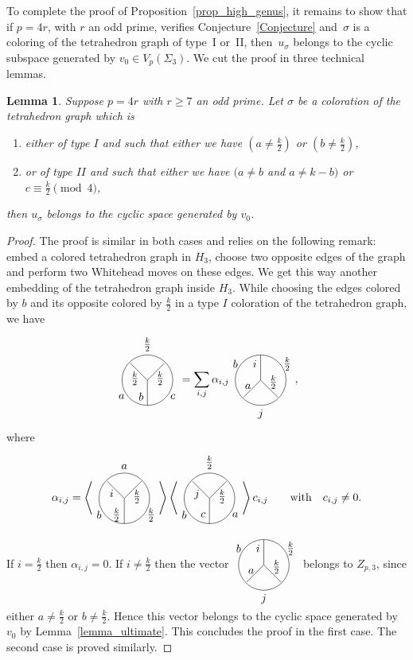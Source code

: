 \documentclass[pdftex]{sigma}
\numberwithin{equation}{section}
\newtheorem{Lemma}[Theorem]{Lemma}
\begin{document}
To complete the proof of Proposition~\ref{prop_high_genus}, it remains to show that if $p=4r$, with $r$ an odd prime, verifies Conjecture~\ref{Conjecture} and~$\sigma$ is a coloring of the tetrahedron graph of type~I or~II, then~$u_{\sigma}$ belongs to the cyclic subspace generated by $v_0\in V_p(\Sigma_3)$. We cut the proof in three technical lemmas.

\begin{Lemma}\label{lemma_mama} Suppose $p=4r$ with $r\geq 7$ an odd prime. Let $\sigma$ be a coloration of the tetrahedron graph which is
\begin{enumerate}\itemsep=0pt
\item[$1)$] either of type $I$ and such that either we have $(a\neq \frac{k}{2})$ or $(b\neq \frac{k}{2})$,
\item[$2)$] or of type $II$ and such that either we have $(a\neq b$ and $a\neq k-b)$ or $c\equiv \frac{k}{2} \pmod{4}$,
\end{enumerate}
 then $u_{\sigma}$ belongs to the cyclic space generated by $v_0$.
\end{Lemma}

\begin{proof}The proof is similar in both cases and relies on the following remark: embed a colored tetrahedron graph in $H_3$, choose two opposite edges of the graph and perform two Whitehead moves on these edges. We get this way another embedding of the tetrahedron graph inside $H_3$. While choosing the edges colored by $b$ and its opposite colored by $\frac{k}{2}$ in a type $I$ coloration of the tetrahedron graph, we have
\begin{gather*}
 \Tetahedrongraph{$\frac{k}{2}$}{$\frac{k}{2}$}{$\frac{k}{2}$}{$a$}{$b$}{$c$} = \sum_{i,j} \alpha_{i,j} \invTetahedrongraph{$b$}{$i$}{$\frac{k}{2}$}{$a$}{$j$}{$\frac{k}{2}$},
\end{gather*}
where
\begin{gather*}
\alpha_{i,j}=\left< \Tetahedrongraph{$a$}{$i$}{$\frac{k}{2}$}{$b$}{$\frac{k}{2}$}{$\frac{k}{2}$}\right> \left< \Tetahedrongraph{$\frac{k}{2}$}{$j$}{$\frac{k}{2}$}{$b$}{$c$}{$a$} \right>c_{i,j} \qquad \text{with} \quad
c_{i,j}\neq 0.
\end{gather*}

 If $i=\frac{k}{2}$ then $\alpha_{i,j}=0$. If $i\neq \frac{k}{2}$ then the vector $ \invTetahedrongraph{$b$}{$i$}{$\frac{k}{2}$}{$a$}{$j$}{$\frac{k}{2}$}$ belongs to $Z_{p,3}$, since either $a\neq \frac{k}{2}$ or $b\neq \frac{k}{2}$. Hence this vector belongs to the cyclic space generated by $v_0$ by Lemma~\ref{lemma_ultimate}. This concludes the proof in the first case. The second case is proved similarly.
\end{proof}
\end{document}
